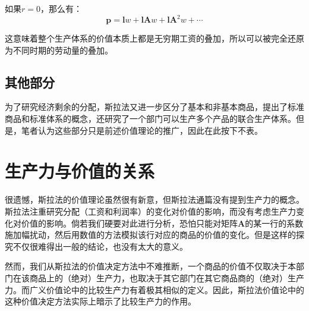 如果$r=0$，那么有：
\begin{equation}
    \bm{p} = \bm{l}w + \bm{l}\bm{A}w + \bm{l}\bm{A}^2w + \cdots
\end{equation}

这意味着整个生产体系的价值本质上都是无穷期工资的叠加，所以可以被完全还原为不同时期的劳动量的叠加。

\subsection{其他部分}

为了研究经济剩余的分配，斯拉法又进一步区分了基本和非基本商品，提出了标准商品和标准体系的概念，还研究了一个部门可以生产多个产品的联合生产体系。但是，笔者认为这些部分只是前述价值理论的推广，因此在此按下不表。

\section{生产力与价值的关系}

很遗憾，斯拉法的价值理论虽然很有新意，但斯拉法通篇没有提到生产力的概念。斯拉法注重研究分配（工资和利润率）的变化对价值的影响，而没有考虑生产力变化对价值的影响。倘若我们硬要对此进行分析，恐怕只能对矩阵$\bm{A}$的某一行的系数施加幅扰动，然后用数值的方法模拟该行对应的商品的价值的变化。但是这样的探究不仅很难得出一般的结论，也没有太大的意义。

然而，我们从斯拉法的价值决定方法中不难推断，一个商品的价值不仅取决于本部门在该商品上的（绝对）生产力，也取决于其它部门在其它商品商的（绝对）生产力。而广义价值论中的比较生产力有着极其相似的定义。因此，斯拉法价值论中的这种价值决定方法实际上暗示了比较生产力的作用。